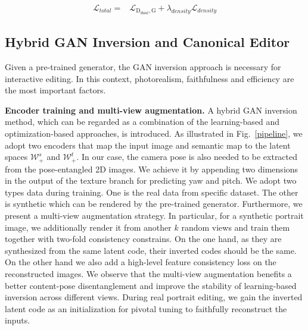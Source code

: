 \documentclass[acmtog]{acmart}
\begin{document}
\begin{equation}
    \begin{split}
    \mathcal{L}_{total} = 
    &\mathcal{L}_{\mathrm{D}_{dual}, \mathrm{G}} + \lambda_{density} \mathcal{L}_{density}
    \end{split}
    \label{eq:generator loss}
\end{equation}

\subsection{Hybrid GAN Inversion and Canonical Editor}
\label{sec:3.2}



Given a pre-trained generator, the GAN inversion approach is necessary for interactive editing. In this context, photorealism, faithfulness and efficiency are the most important factors.

\noindent \textbf{Encoder training and multi-view augmentation.}
A hybrid GAN inversion method, which can be regarded as a combination of the learning-based and optimization-based approaches, is introduced. As illustrated in Fig.~\ref{pipeline}, we adopt two encoders that map the input image and semantic map to the latent spaces $\mathcal{W}^{s}_+$ and $\mathcal{W}^{t}_+$. In our case, the camera pose is also needed to be extracted from the pose-entangled 2D images. We achieve it by appending two dimensions in the output of the texture branch for predicting yaw and pitch. We adopt two types data during training. One is the real data from specific dataset. The other is synthetic which can be rendered by the pre-trained generator. Furthermore, we present a multi-view augmentation strategy. In particular, for a synthetic portrait image, we additionally render it from another $k$ random views and train them together with two-fold consistency constrains. On the one hand, as they are synthesized from the same latent code, their inverted codes should be the same. On the other hand we also add a high-level feature consistency loss on the reconstructed images. We observe that the multi-view augmentation benefits a better content-pose disentanglement and improve the stability of learning-based inversion across different views. During real portrait editing, we gain the inverted latent code as an initialization for pivotal tuning \cite{roich2021pivotal} to faithfully reconstruct the inputs.
\end{document}
